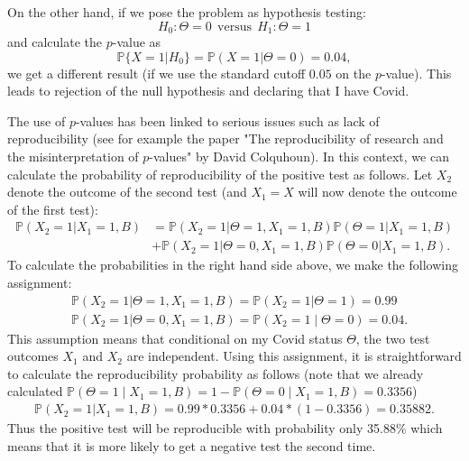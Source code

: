 \documentclass{scrartcl}
\renewcommand{\P}{{\mathbb P}}
\begin{document}
On the other hand, if we pose the problem as hypothesis testing: 
\begin{equation*}
    H_0 : \Theta = 0  ~~ \text{versus} ~~ H_1: \Theta = 1
\end{equation*}
and calculate the $p$-value as
\begin{equation*}
    \P\{X = 1 | H_0\} = \P(X = 1 | \Theta = 0) = 0.04, 
\end{equation*}
we get a different result (if we use the standard cutoff $0.05$ on the
$p$-value). This leads to 
rejection of the null hypothesis and declaring that I have
Covid.

The use of $p$-values has been linked to serious issues such as lack of
reproducibility (see for example the paper "The reproducibility of research and the misinterpretation of
$p$-values" by David Colquhoun). In this context, we can
calculate the probability of reproducibility of the positive test
as follows. Let $X_2$ denote the outcome of the second test (and
$X_1 = X$ will now denote the outcome of the first test): 
\begin{align*}
    \P(X_2 = 1 | X_1 = 1, B) 
    &= \P(X_2 = 1|\Theta = 1, X_1 = 1, B) \P(\Theta = 1 | X_1 = 1, B) 
    \\ 
    &+ \P(X_2 = 1 | \Theta =  0, X_1 = 1, B) \P(\Theta = 0|X_1 = 1, B). 
\end{align*}
To calculate the probabilities in the right hand side above, we make
the following assignment:    
\begin{align*}
    & \P(X_2 = 1|\Theta = 1, X_1 = 1, B) = \P(X_2 = 1|\Theta = 1) =
    0.99 \\ &\P(X_2 = 1| 
    \Theta = 0, X_1 = 1, B) = \P(X_2 = 1 \mid \Theta = 0) = 0.04. 
\end{align*}
This assumption means that conditional on my Covid status $\Theta$,
the two test outcomes $X_1$ and $X_2$ are independent. Using this
assignment, it is straightforward 
to calculate the reproducibility probability as follows (note that
we already calculated $\P(\Theta = 1 \mid X_1 = 1, B) = 1 - \P(
\Theta = 0 \mid X_1 = 1, B)
= 0.3356$)
\begin{align*}
    \P(X_2 = 1| X_1 = 1, B) = 0.99 * 0.3356 + 0.04 * (1-0.3356) = 0.35882. 
\end{align*}
Thus the positive test will be reproducible with probability only
35.88\% which means that it is more likely to get a negative test
the second time.   
\end{document}
